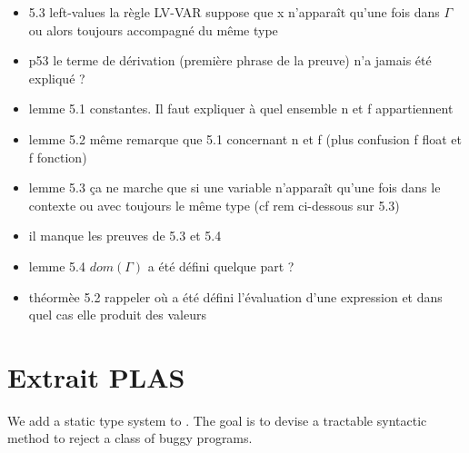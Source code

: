 \begin{itemize}
\item
  5.3 left-values la règle LV-VAR suppose que x n'apparaît qu'une fois
  dans $\Gamma$ ou alors toujours accompagné du même type
\item
  p53 le terme de dérivation (première phrase de la preuve) n'a jamais
  été expliqué ?
\item
  lemme 5.1 constantes. Il faut expliquer à quel ensemble n et f
  appartiennent
\item
  lemme 5.2 même remarque que 5.1 concernant n et f (plus confusion f
  float et f fonction)
\item
  lemme 5.3 ça ne marche que si une variable n'apparaît qu'une fois dans
  le contexte ou avec toujours le même type (cf rem ci-dessous sur 5.3)
\item
  il manque les preuves de 5.3 et 5.4
\item
  lemme 5.4 $dom(\Gamma)$ a été défini quelque part ?
\item
  théormèe 5.2 rappeler où a été défini l'évaluation d'une expression et
  dans quel cas elle produit des valeurs
\end{itemize}

\section*{Extrait PLAS}

We add a static type system to \langname. The goal is to devise a tractable
syntactic method to reject a class of buggy programs.

